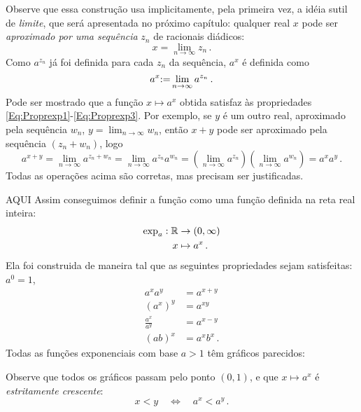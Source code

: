 Observe que essa construção usa implicitamente, pela primeira vez, a idéia
sutil de \emph{limite}, que será apresentada no próximo capítulo: qualquer
real
$x$ pode ser \emph{aproximado por uma sequência} $z_n$
de racionais diádicos: 
$$x=\lim_{n\to \infty}z_n\,.$$ 
Como $a^{z_n}$ já foi definida para cada $z_n$ da sequência, $a^x$ é definida como 
$$a^x{:=} \lim_{n\to \infty}a^{z_n}\,.$$
Pode ser mostrado que a função $x\mapsto a^x$ obtida satisfaz às propriedades
\eqref{Eq:Proprexp1}-\eqref{Eq:Proprexp3}. Por exemplo, se $y$ é um outro real,
aproximado pela sequência $w_n$, $y=\lim_{n\to \infty}w_n$, então $x+y$ pode ser
aproximado pela sequência $(z_n+w_n)$, logo
$$
a^{x+y}=\lim_{n\to \infty}a^{z_n+w_n}
=\lim_{n\to \infty}a^{z_n}a^{w_n}
=(\lim_{n\to \infty}a^{z_n})(\lim_{n\to \infty}a^{w_n})=a^xa^y\,.
$$
Todas as operações acima são corretas, mas precisam ser justificadas.

AQUI
Assim conseguimos definir a função  como uma
função definida na reta real inteira:
\begin{align*}
 \exp_a:\mathbb{R}&\to(0,\infty)\\
x&\mapsto a^x\,.
\end{align*}
Ela foi construida de maneira tal que as seguintes propriedades sejam
satisfeitas: $a^0=1$,
\begin{align}
a^xa^y&=a^{x+y}\label{Eq:PropExpon1}\\
(a^x)^y&=a^{xy}\label{Eq:PropExpon2}\\
\frac{a^x}{a^y}&=a^{x-y}\label{Eq:PropExpon3}\\
(ab)^x&=a^xb^x\label{Eq:PropExpon4}\,.
\end{align}
Todas as funções exponenciais com base $a>1$ têm gráficos parecidos: 

\begin{center}
\begin{bmlimage}\end{bmlimage}
\end{center}
Observe que todos os gráficos passam pelo ponto $(0,1)$, e que $x\mapsto a^x$
é \emph{estritamente crescente}:
$$x<y\quad \Leftrightarrow \quad a^x<a^y\,.$$


